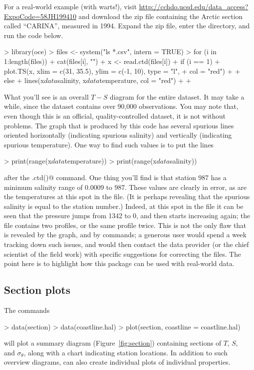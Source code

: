 \documentclass{article}
\begin{document}
For a real-world example (with warts!), visit
\url{http://cchdo.ucsd.edu/data_access?ExpoCode=58JH199410} and download the zip
file containing the Arctic section called ``CARINA'', measured in 1994. Expand
the zip file, enter the directory, and run the code below.
\begin{Schunk}
\begin{Sinput}
> library(oce)
> files <- system("ls *.csv", intern = TRUE)
> for (i in 1:length(files)) {
+     cat(files[i], "\n")
+     x <- read.ctd(files[i])
+     if (i == 1) {
+         plot.TS(x, xlim = c(31, 35.5), ylim = c(-1, 10), type = "l", 
+             col = "red")
+     }
+     else {
+         lines(x$data$salinity, x$data$temperature, col = "red")
+     }
+ }
\end{Sinput}
\end{Schunk}

What you'll see is an overall $T-S$ diagram for the entire dataset. It may take
a while, since the dataset contains over 90,000 observations. You may note that,
even though this is an official, quality-controlled dataset, it is not without
problems. The graph that is produced by this code has several spurious lines
oriented horizontally (indicating spurious salinity) and vertically (indicating
spurious temperature). One way to find such values is to put the lines
\begin{Schunk}
\begin{Sinput}
> print(range(x$data$temperature))
> print(range(x$data$salinity))
\end{Sinput}
\end{Schunk}
after the \verb@read.ctd()@ command. One thing you'll find is that station 987
has a minimum salinity range of 0.0009 to 987. These values are clearly in
error, as are the temperatures at this spot in the file. (It is perhaps
revealing that the spurious salinity is equal to the station number.) Indeed, at
this spot in the file it can be seen that the pressure jumps from 1342 to 0, and
then starts increasing again; the file contains two profiles, or the same
profile twice. This is not the only flaw that is revealed by the graph, and by
\verb@range@ commands; a generous user would spend a week tracking down such
issues, and would then contact the data provider (or the chief scientist of the
field work) with specific suggestions for correcting the files. The point here
is to highlight how this package can be used with real-world data.

\subsection{Section plots}
The commands
\begin{Schunk}
\begin{Sinput}
> data(section)
> data(coastline.hal)
> plot(section, coastline = coastline.hal)
\end{Sinput}
\end{Schunk}
will plot a summary diagram (Figure~\ref{fig:section}) containing sections of
$T$, $S$, and $\sigma_\theta$, along with a chart indicating station
locations. In addition to such overview diagrams, \verb@plot@ can also create
individual plots of individual properties.
\end{document}
